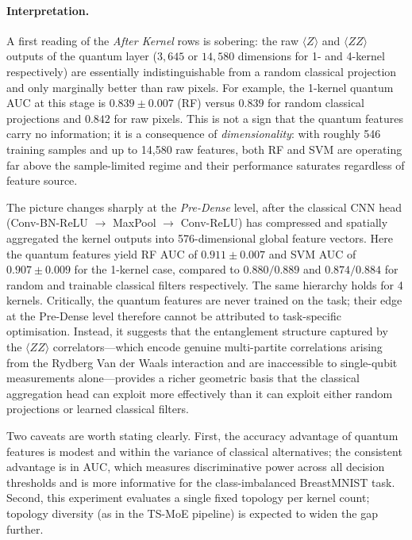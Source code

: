 \documentclass[11pt,a4paper]{article}
\begin{document}
\paragraph{Interpretation.}
A first reading of the \emph{After Kernel} rows is sobering: the raw $\langle Z \rangle$ and $\langle ZZ \rangle$ outputs of the quantum layer ($3{,}645$ or $14{,}580$ dimensions for 1- and 4-kernel respectively) are essentially indistinguishable from a random classical projection and only marginally better than raw pixels. For example, the 1-kernel quantum AUC at this stage is $0.839 \pm 0.007$ (RF) versus $0.839$ for random classical projections and $0.842$ for raw pixels. This is not a sign that the quantum features carry no information; it is a consequence of \emph{dimensionality}: with roughly 546 training samples and up to 14,580 raw features, both RF and SVM are operating far above the sample-limited regime and their performance saturates regardless of feature source.

The picture changes sharply at the \emph{Pre-Dense} level, after the classical CNN head (Conv-BN-ReLU $\rightarrow$ MaxPool $\rightarrow$ Conv-ReLU) has compressed and spatially aggregated the kernel outputs into 576-dimensional global feature vectors. Here the quantum features yield RF AUC of $0.911 \pm 0.007$ and SVM AUC of $0.907 \pm 0.009$ for the 1-kernel case, compared to $0.880/0.889$ and $0.874/0.884$ for random and trainable classical filters respectively. The same hierarchy holds for 4 kernels. Critically, the quantum features are never trained on the task; their edge at the Pre-Dense level therefore cannot be attributed to task-specific optimisation. Instead, it suggests that the entanglement structure captured by the $\langle ZZ \rangle$ correlators---which encode genuine multi-partite correlations arising from the Rydberg Van der Waals interaction and are inaccessible to single-qubit measurements alone---provides a richer geometric basis that the classical aggregation head can exploit more effectively than it can exploit either random projections or learned classical filters.

Two caveats are worth stating clearly. First, the accuracy advantage of quantum features is modest and within the variance of classical alternatives; the consistent advantage is in AUC, which measures discriminative power across all decision thresholds and is more informative for the class-imbalanced BreastMNIST task. Second, this experiment evaluates a single fixed topology per kernel count; topology diversity (as in the TS-MoE pipeline) is expected to widen the gap further.
\end{document}
